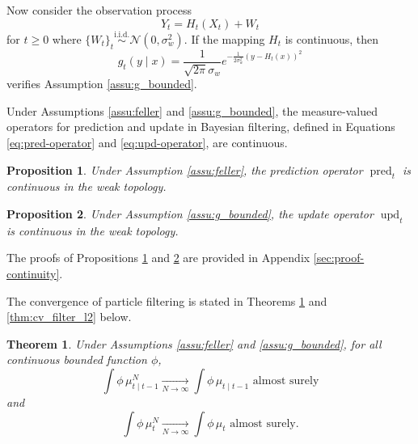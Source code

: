 \documentclass{article}
\newtheorem{prop}{Proposition}
\newtheorem{thm}{Theorem}
\newcommand{\simiid}{\overset{\text{i.i.d.}}{\sim}}
\newcommand{\limN}{\underset{N \rightarrow \infty}{\longrightarrow}}
\DeclareMathOperator{\pred}{pred}
\DeclareMathOperator{\upd}{upd}
\begin{document}
Now consider the observation process
\begin{equation}
\label{eq:obs_process}
    Y_t = H_t(X_t) + W_t
\end{equation}
for $t \geq 0$ where $\{W_t\}_t \simiid \mathcal N(0,\sigma_w^2)$. If the mapping $H_t$ is continuous, then
\begin{equation*}
    g_t(y \mid x) = \frac{1}{\sqrt{2\pi} \sigma_w} e^{-\frac{1}{2\sigma_w^2}(y-H_t(x))^2}
\end{equation*}
verifies Assumption \ref{assu:g_bounded}.

Under Assumptions \ref{assu:feller} and \ref{assu:g_bounded}, the measure-valued operators for prediction and update in Bayesian filtering, defined in Equations \eqref{eq:pred-operator} and \eqref{eq:upd-operator}, are continuous.

\begin{prop}\label{prop:pred_continuous}
    Under Assumption \ref{assu:feller}, the prediction operator $\pred_t$ is continuous in the weak topology.
\end{prop}

\begin{prop}\label{prop:upd_continuous}
    Under Assumption \ref{assu:g_bounded}, the update operator $\upd_t$ is continuous in the weak topology.
\end{prop}

The proofs of Propositions \ref{prop:pred_continuous} and \ref{prop:upd_continuous} are provided in Appendix \ref{sec:proof-continuity}.

The convergence of particle filtering is stated in Theorems \ref{thm:cv_filter} and \ref{thm:cv_filter_l2} below.

\begin{thm}\label{thm:cv_filter}
    Under Assumptions \ref{assu:feller} and \ref{assu:g_bounded}, for all continuous bounded function $\phi$,
    $$\int \phi \, \mu^N_{t \mid t-1} \limN \int \phi \, \mu_{t \mid t-1} \text{\ \ almost surely}$$
    and
    $$\int \phi \, \mu^N_t \limN \int \phi \, \mu_t \text{\ \ almost surely.}$$
\end{thm}
\end{document}
